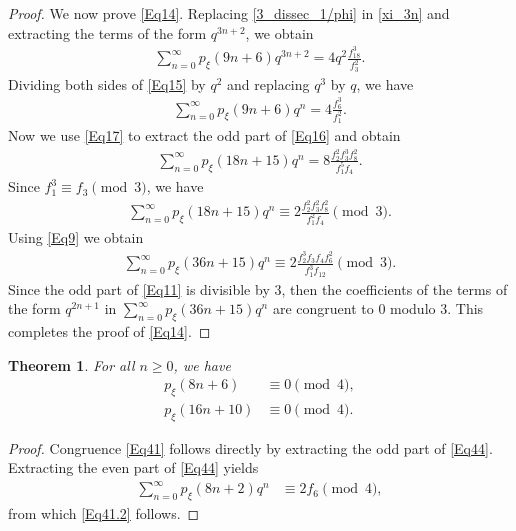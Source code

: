 \documentclass[12pt]{article}
\newtheorem{theorem}{Theorem}[section]
\begin{document}
\begin{proof}
We now prove \eqref{Eq14}. Replacing \eqref{3_dissec_1/phi} in \eqref{xi_3n} and extracting the terms of the form $q^{3n+2}$, we obtain
\begin{align}
\sum_{n=0}^{\infty} p_{\xi}(9n+6)q^{3n+2} = 4q^2\displaystyle\frac{f_{18}^3}{f_{3}^2}.
\label{Eq15}
\end{align}
Dividing both sides of \eqref{Eq15} by $q^2$ and replacing $q^3$ by $q$, we have
\begin{align}
\sum_{n=0}^{\infty} p_{\xi}(9n+6)q^{n} = 4\displaystyle\frac{f_{6}^3}{f_{1}^2}.
\label{Eq16}
\end{align}
Now we use \eqref{Eq17} to extract the odd part of \eqref{Eq16} and obtain
\begin{align*}
\sum_{n=0}^{\infty} p_{\xi}(18n+15)q^{n} = 8\displaystyle\frac{f_{2}^2f_3^3f_8^2}{f_{1}^5f_4}.
\end{align*}
Since $f_1^3 \equiv f_3 \pmod{3}$, we have
\begin{align*}
\sum_{n=0}^{\infty} p_{\xi}(18n+15)q^{n} \equiv 2\displaystyle\frac{f_{2}^2f_3^2f_8^2}{f_{1}^2f_4} \pmod{3}.
\end{align*}
Using \eqref{Eq9} we obtain
\begin{align*}
\sum_{n=0}^{\infty} p_{\xi}(36n+15)q^{n} \equiv 2\displaystyle\frac{f_{2}^3f_3f_4f_6^2}{f_{1}^3f_{12}} \pmod{3}.
\end{align*}
Since the odd part of \eqref{Eq11} is divisible by $3$, then the coefficients of the terms of the form $q^{2n+1}$ in $\sum_{n=0}^{\infty} p_{\xi}(36n+15)q^{n}$ are congruent to $0$ modulo $3$. This completes the proof of \eqref{Eq14}.	
\end{proof}


\begin{theorem} For all $n \geq 0$, we have
\begin{align}
p_{\xi}(8n+6) & \equiv 0 \pmod{4}, \label{Eq41} \\
p_{\xi}(16n+10) & \equiv 0 \pmod{4}. \label{Eq41.2}
\end{align}
\end{theorem}

\begin{proof}
Congruence \eqref{Eq41} follows directly by extracting the odd part of \eqref{Eq44}.  Extracting  the even part of \eqref{Eq44} yields
\begin{align*}
\sum_{n=0}^{\infty} p_{\xi}(8n+2)q^n &  \equiv 2f_{6} \pmod{4},
\end{align*}
from which \eqref{Eq41.2} follows. 
\end{proof}
\end{document}
